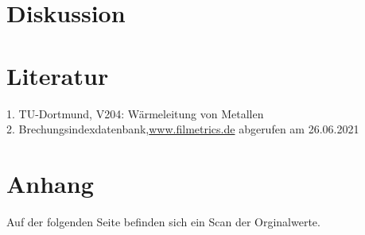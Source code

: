 \section{Diskussion}
 
\section{Literatur}
1. TU-Dortmund, V204: Wärmeleitung von Metallen\\
2. Brechungsindexdatenbank,\hyperlink{https://www.filmetrics.de/refractive-index-database}{www.filmetrics.de} abgerufen am 26.06.2021\\
\section{Anhang}
Auf der folgenden Seite befinden sich ein Scan der Orginalwerte.